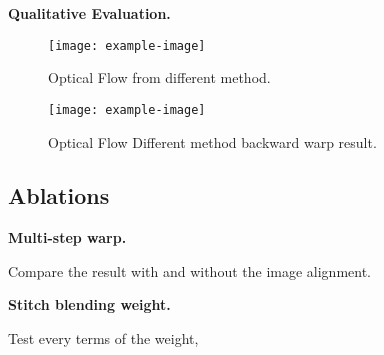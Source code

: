 

\textbf{Qualitative Evaluation.}



\begin{figure}[hbt!]
	\centering
	\texttt{[image: example-image]}
	\caption{Optical Flow from different method.}
	\label{fig:exp:compflow}
\end{figure}

\begin{figure}[hbt!]
	\centering
	\texttt{[image: example-image]}
	\caption{Optical Flow Different method backward warp result.}
	\label{fig:exp:backwardwarp}
\end{figure}


\subsection{Ablations}

\textbf{Multi-step warp.}

Compare the result with and without the image alignment.

\textbf{Stitch blending weight.}

Test every terms of the weight,
